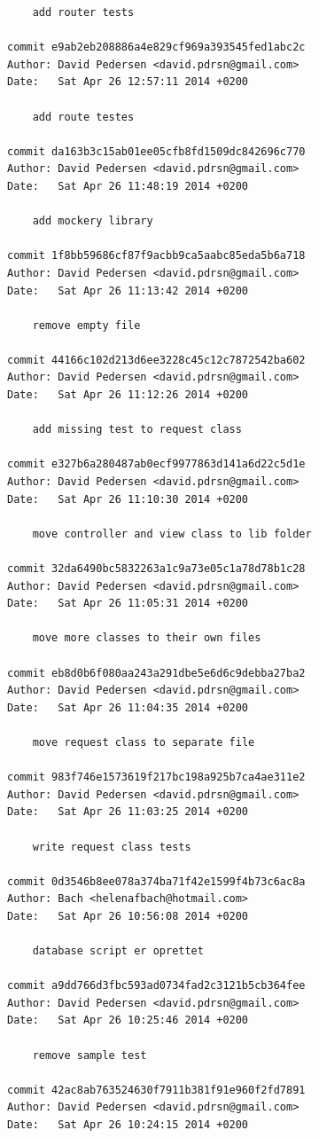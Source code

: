 \documentclass[12pt]{article}
\begin{document}
\begin{verbatim}
    add router tests

commit e9ab2eb208886a4e829cf969a393545fed1abc2c
Author: David Pedersen <david.pdrsn@gmail.com>
Date:   Sat Apr 26 12:57:11 2014 +0200

    add route testes

commit da163b3c15ab01ee05cfb8fd1509dc842696c770
Author: David Pedersen <david.pdrsn@gmail.com>
Date:   Sat Apr 26 11:48:19 2014 +0200

    add mockery library

commit 1f8bb59686cf87f9acbb9ca5aabc85eda5b6a718
Author: David Pedersen <david.pdrsn@gmail.com>
Date:   Sat Apr 26 11:13:42 2014 +0200

    remove empty file

commit 44166c102d213d6ee3228c45c12c7872542ba602
Author: David Pedersen <david.pdrsn@gmail.com>
Date:   Sat Apr 26 11:12:26 2014 +0200

    add missing test to request class

commit e327b6a280487ab0ecf9977863d141a6d22c5d1e
Author: David Pedersen <david.pdrsn@gmail.com>
Date:   Sat Apr 26 11:10:30 2014 +0200

    move controller and view class to lib folder

commit 32da6490bc5832263a1c9a73e05c1a78d78b1c28
Author: David Pedersen <david.pdrsn@gmail.com>
Date:   Sat Apr 26 11:05:31 2014 +0200

    move more classes to their own files

commit eb8d0b6f080aa243a291dbe5e6d6c9debba27ba2
Author: David Pedersen <david.pdrsn@gmail.com>
Date:   Sat Apr 26 11:04:35 2014 +0200

    move request class to separate file

commit 983f746e1573619f217bc198a925b7ca4ae311e2
Author: David Pedersen <david.pdrsn@gmail.com>
Date:   Sat Apr 26 11:03:25 2014 +0200

    write request class tests

commit 0d3546b8ee078a374ba71f42e1599f4b73c6ac8a
Author: Bach <helenafbach@hotmail.com>
Date:   Sat Apr 26 10:56:08 2014 +0200

    database script er oprettet

commit a9dd766d3fbc593ad0734fad2c3121b5cb364fee
Author: David Pedersen <david.pdrsn@gmail.com>
Date:   Sat Apr 26 10:25:46 2014 +0200

    remove sample test

commit 42ac8ab763524630f7911b381f91e960f2fd7891
Author: David Pedersen <david.pdrsn@gmail.com>
Date:   Sat Apr 26 10:24:15 2014 +0200


\end{verbatim}
\end{document}
